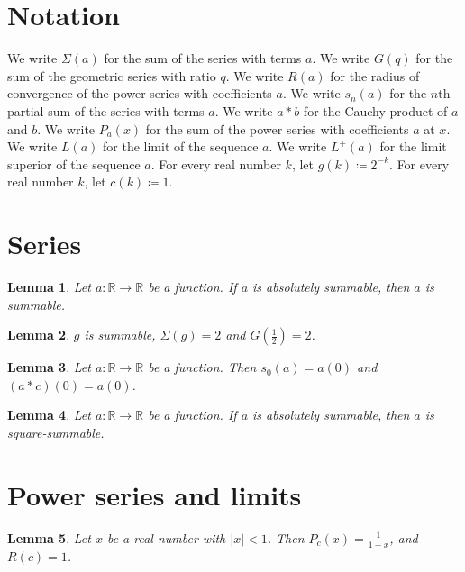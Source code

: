 \documentclass{article}
\newtheorem{lemma}{Lemma}
\begin{document}
\section{Notation}

We write $\Sigma(a)$ for the sum of the series with terms $a$.
We write $G(q)$ for the sum of the geometric series with ratio $q$.
We write $R(a)$ for the radius of convergence of the power series with coefficients $a$.
We write $s_n(a)$ for the $n$th partial sum of the series with terms $a$.
We write $a\ast b$ for the Cauchy product of $a$ and $b$.
We write $P_a(x)$ for the sum of the power series with coefficients $a$ at $x$.
We write $L(a)$ for the limit of the sequence $a$.
We write $L^+(a)$ for the limit superior of the sequence $a$.
For every real number $k$, let $g(k)\coloneqq 2^{-k}$.
For every real number $k$, let $c(k)\coloneqq 1$.

\section{Series}

\begin{lemma}\label{absolute}
Let $a:\mathbb{R}\to\mathbb{R}$ be a function. If $a$ is absolutely summable, then $a$ is summable.
\end{lemma}

\begin{lemma}\label{geometric}
$g$ is summable, $\Sigma(g)=2$ and $G(\frac12)=2$.
\end{lemma}

\begin{lemma}\label{partial}
Let $a:\mathbb{R}\to\mathbb{R}$ be a function. Then $s_0(a)=a(0)$ and $(a\ast c)(0)=a(0)$.
\end{lemma}

\begin{lemma}\label{square}
Let $a:\mathbb{R}\to\mathbb{R}$ be a function. If $a$ is absolutely summable, then $a$ is square-summable.
\end{lemma}

\section{Power series and limits}

\begin{lemma}\label{power}
Let $x$ be a real number with $|x|<1$. Then $P_c(x)=\frac{1}{1-x}$, and $R(c)=1$.
\end{lemma}
\end{document}
